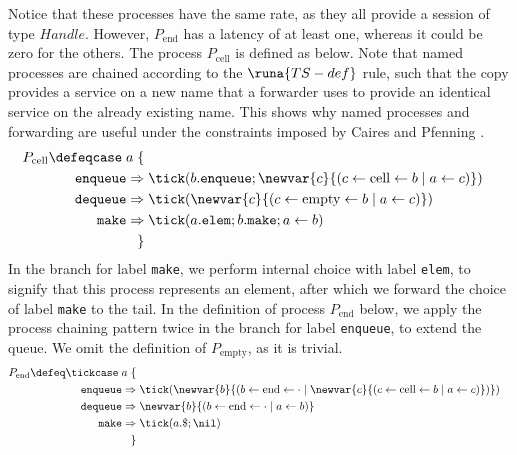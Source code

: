 Notice that these processes have the same rate, as they all provide a session of type $\textit{Handle}$. However, $P_{\text{end}}$ has a latency of at least one, whereas it could be zero for the others. The process $P_{\text{cell}}$ is defined as below. Note that named processes are chained according to the $\runa{TS-def}$ rule, such that the copy provides a service on a new name that a forwarder uses to provide an identical service on the already existing name. This shows why named processes and forwarding are useful under the constraints imposed by Caires and Pfenning \cite{CairesPfenning2010}.
\begin{align*}
    P_{\text{cell}} \defeq \texttt{case}\; a\; \{\\
    \texttt{enqueue} \Rightarrow&\; \tick (b.\texttt{enqueue} ; \newvar{c}{(c \leftarrow \text{cell} \leftarrow b \mid a \leftarrow c)}) \\
    \texttt{dequeue} \Rightarrow&\; \tick (\newvar{c}{(c \leftarrow \text{empty} \leftarrow b \mid a \leftarrow c)})\\
    \texttt{make} \Rightarrow&\;  \tick (a.\texttt{elem}; b.\texttt{make}; a \leftarrow b)\\
    \}
\end{align*}
In the branch for label \texttt{make}, we perform internal choice with label \texttt{elem}, to signify that this process represents an element, after which we forward the choice of label \texttt{make} to the tail. In the definition of process $P_{\text{end}}$ below, we apply the process chaining pattern twice in the branch for label \texttt{enqueue}, to extend the queue. We omit the definition of $P_\text{empty}$, as it is trivial.
\begin{align*}
    P_{\text{end}} \defeq \tick\texttt{case}\; a\; \{\\
    \texttt{enqueue} \Rightarrow&\; \tick (\newvar{b}{(b \leftarrow \text{end} \leftarrow \cdot \mid \newvar{c}{(c \leftarrow \text{cell} \leftarrow b \mid a \leftarrow c)})})\\
    \texttt{dequeue} \Rightarrow&\; \newvar{b}{(b \leftarrow \text{end} \leftarrow \cdot \mid a \leftarrow b)}\\
    \texttt{make} \Rightarrow&\; \tick (a.\$ ; \nil)\\
    \}
\end{align*}
%
